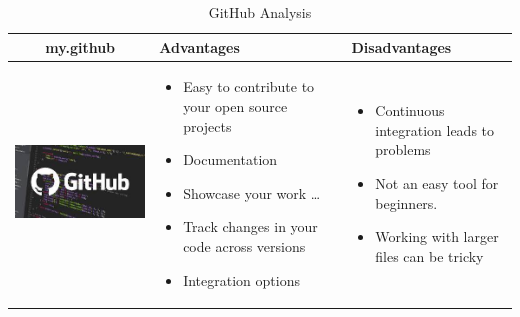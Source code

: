 \documentclass{article}
\begin{document}
	
	\begin{table}[h!]
		\centering
		\begin{tabular}{ | c | m{5cm} | m{5cm} | }
			\hline
			my.github & Advantages & Disadvantages \\ \hline
			\begin{minipage}{.4\textwidth}
				\includegraphics[width=\linewidth, height=40mm]{github.jpg}
			\end{minipage}
			&
			\begin{itemize}
				\item Easy to contribute to your open source projects
				\item Documentation
				\item Showcase your work \ldots
				\item Track changes in your code across versions
				\item Integration options
			\end{itemize}
		&
			\begin{itemize}
				\item Continuous integration leads to problems
				\item Not an easy tool for beginners.
				\item Working with larger files can be tricky
			\end{itemize}
		\\ \hline
		\end{tabular}
		\caption{GitHub Analysis}\label{tbl:mygitHub}	
	\end{table}
	
\end{document}
